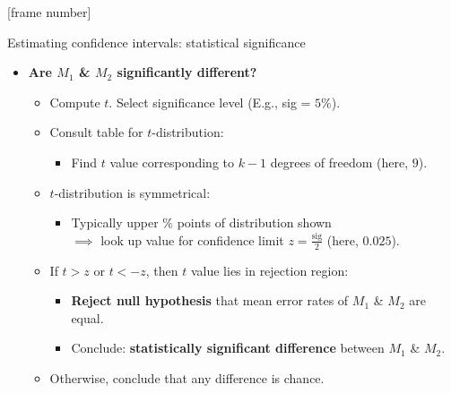 \documentclass[aspectratio=169,t,table]{beamer}
\begin{document}
  {
    [frame number]
    \begin{frame}{Estimating confidence intervals: statistical significance}
      \begin{itemize}
        \item \textbf{Are $M_1$ \& $M_2$ {\color{airforceblue} significantly different}?}
        \begin{itemize}
          \item Compute $t$. Select significance level (E.g., sig = $5\%$).
          \item Consult table for $t$-distribution:
          \begin{itemize}
            \item Find $t$ value corresponding to $k-1$ degrees of freedom (here, $9$).
          \end{itemize}
          \item $t$-distribution is symmetrical:
          \begin{itemize}
            \item Typically upper $\%$ points of distribution shown \\
                  $\implies$ look up value for confidence limit $z = \frac{\text{sig}}{2}$ (here, $0.025$).
          \end{itemize}
          \item If $t > z$ or $t < -z$, then $t$ value lies in rejection region:
                \begin{itemize}
                  \item \textbf{Reject null hypothesis} that mean error rates of $M_1$ \& $M_2$ are equal.
                  \item Conclude: \textbf{statistically significant difference} between $M_1$ \& $M_2$.
                \end{itemize}
          \item Otherwise, conclude that any difference is chance.
        \end{itemize}
      \end{itemize}
    \end{frame}
  }
\end{document}
